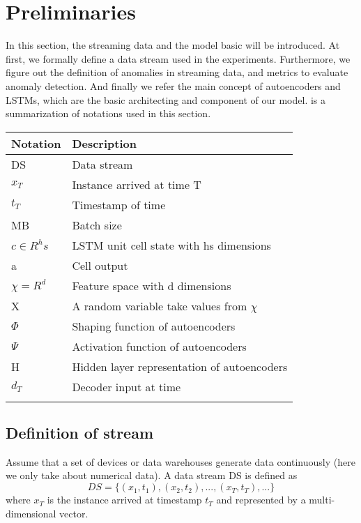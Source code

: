 \chapter{Preliminaries}
\label{chap:Preliminaries}

In this section, the streaming data and the model basic will be introduced. At first, we formally define a data stream used in the experiments. Furthermore, we figure out the definition of anomalies in streaming data, and metrics to evaluate anomaly detection. And finally we refer the main concept of autoencoders and LSTMs, which are the basic architecting and component of our model.  is a summarization of notations used in this section.

\begin{table}[h]
\begin{center}
\begin{tabular}{|l|l|}
\hline
Notation & Description \\ \hline
DS & Data stream \\
$x_{T}$ & Instance arrived at time T \\
$t_T$ & Timestamp of time \\
MB & Batch size	\\	
$c \in R^hs$ & LSTM unit cell state with hs dimensions \\
a & Cell output  \\ 
$\chi = R^d $ & Feature space with d dimensions  \\
X & A random variable take values from $\chi$	\\
$\Phi$ & Shaping function of autoencoders	\\	
$\Psi$ & Activation function of autoencoders	 \\
H & Hidden layer representation of autoencoders  \\
$d_T$ & Decoder input at time \\  \hline


\label{tab:notation}
\end{tabular}
\end{center}
\end{table}


\section{Definition of stream}
\label{sec:Definition of stream}

Assume that a set of devices or data warehouses generate data continuously (here we only take about numerical data). A data stream DS is defined as 
\begin{equation} \label{eq:DS}
DS = \{(x_1,t_1),(x_2,t_2), ... , (x_T,t_T), ...\}
\end{equation}
where \textbf{$x_T$} is the instance arrived at timestamp \textbf{$t_T$} and represented by a multi-dimensional vector.\\


